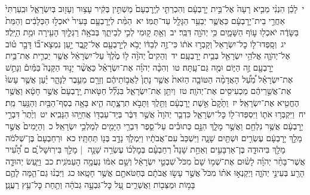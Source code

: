 \documentclass[18pt]{article}
\newcommand{\vart}[1]{\Bfootnote{#1}}	%
\begin{document}
 {\loc י~}לָכֵ֗ן הִנְנִ֨י מֵבִ֤יא רָעָה֙ אֶל־בֵּ֣ית יָרׇבְעָ֔ם וְהִכְרַתִּ֤י לְיָֽרׇבְעָם֙ מַשְׁתִּ֣ין בְּקִ֔יר עָצ֥וּר וְעָז֖וּב בְּיִשְׂרָאֵ֑ל וּבִֽעַרְתִּי֙ אַחֲרֵ֣י בֵית־יָרׇבְעָ֔ם כַּאֲשֶׁ֛ר יְבַעֵ֥ר הַגָּלָ֖ל עַד־תֻּמּֽוֹ׃ \startlock
 {\loc יא~}הַמֵּ֨ת לְיָרׇבְעָ֤ם בָּעִיר֙ יֹאכְל֣וּ הַכְּלָבִ֔ים וְהַמֵּת֙ בַּשָּׂדֶ֔ה יֹאכְל֖וּ ע֣וֹף הַשָּׁמָ֑יִם כִּ֥י יְהֹוָ֖ה דִּבֵּֽר׃ \startlock
 {\loc יב~}וְאַ֥תְּ ק֖וּמִי לְכִ֣י לְבֵיתֵ֑ךְ בְּבֹאָ֥הֿ רַגְלַ֛יִךְ הָעִ֖ירָה וּמֵ֥ת הַיָּֽלֶד׃ \startlock
 {\loc יג~}וְסָֽפְדוּ־ל֤וֹ כׇל־יִשְׂרָאֵל֙ וְקָבְר֣וּ אֹת֔וֹ כִּי־זֶ֣ה לְבַדּ֔וֹ יָבֹ֥א לְיָרׇבְעָ֖ם אֶל־קָ֑בֶר יַ֣עַן נִמְצָא־ב֞וֹ דָּבָ֣ר ט֗וֹב אֶל־יְהֹוָ֛ה אֱלֹהֵ֥י יִשְׂרָאֵ֖ל בְּבֵ֥ית יָרׇבְעָֽם׃ \startlock
 {\loc יד~}וְהֵקִים֩ יְהֹוָ֨ה ל֥וֹ מֶ֙לֶךְ֙ עַל־יִשְׂרָאֵ֔ל אֲשֶׁ֥ר יַכְרִ֛ית אֶת־בֵּ֥ית יָרׇבְעָ֖ם זֶ֣ה הַיּ֑וֹם וּמֶ֖ה גַּם־עָֽתָּה׃ \startlock
 {\loc טו~}וְהִכָּ֨ה יְהֹוָ֜ה אֶת־יִשְׂרָאֵ֗ל כַּאֲשֶׁ֨ר יָנ֣וּד הַקָּנֶה֮ בַּמַּ֒יִם֒ וְנָתַ֣שׁ אֶת־יִשְׂרָאֵ֗ל מֵ֠עַ֠ל הָאֲדָמָ֨ה הַטּוֹבָ֤ה הַזֹּאת֙ אֲשֶׁ֤ר נָתַן֙ לַאֲב֣וֹתֵיהֶ֔ם וְזֵרָ֖ם מֵעֵ֣בֶר לַנָּהָ֑ר יַ֗עַן אֲשֶׁ֤ר עָשׂוּ֙ אֶת־אֲשֵׁ֣רֵיהֶ֔ם מַכְעִיסִ֖ים אֶת־יְהֹוָֽה׃ \startlock
 {\loc טז~}וְיִתֵּ֖ן אֶת־יִשְׂרָאֵ֑ל בִּגְלַ֞ל חַטֹּ֤אות יָֽרׇבְעָם֙ אֲשֶׁ֣ר חָטָ֔א וַאֲשֶׁ֥ר הֶחֱטִ֖יא אֶת־יִשְׂרָאֵֽל׃ \startlock
 {\loc יז~}וַתָּ֙קׇם֙ אֵ֣שֶׁת יָרׇבְעָ֔ם וַתֵּ֖לֶךְ וַתָּבֹ֣א תִרְצָ֑תָה הִ֛יא בָּאָ֥ה בְסַף־הַבַּ֖יִת וְהַנַּ֥עַר מֵֽת׃ \startlock
 {\loc יח~}וַיִּקְבְּר֥וּ אֹת֛וֹ וַיִּסְפְּדוּ־ל֖וֹ כׇּל־יִשְׂרָאֵ֑ל כִּדְבַ֤ר יְהֹוָה֙ אֲשֶׁ֣ר דִּבֶּ֔ר בְּיַד־עַבְדּ֖וֹ אֲחִיָּ֥הוּ הַנָּבִֽיא׃ \startlock
 {\loc יט~}וְיֶ֙תֶר֙ דִּבְרֵ֣י יָרׇבְעָ֔ם אֲשֶׁ֥ר נִלְחַ֖ם וַאֲשֶׁ֣ר מָלָ֑ךְ הִנָּ֣ם כְּתוּבִ֗ים עַל־סֵ֛פֶר דִּבְרֵ֥י הַיָּמִ֖ים לְמַלְכֵ֥י יִשְׂרָאֵֽל׃ \startlock
 {\loc כ~}וְהַיָּמִים֙ אֲשֶׁ֣ר מָלַ֣ךְ יָרׇבְעָ֔ם עֶשְׂרִ֥ים וּשְׁתַּ֖יִם שָׁנָ֑ה וַיִּשְׁכַּב֙ עִם־אֲבֹתָ֔יו וַיִּמְלֹ֛ךְ נָדָ֥ב בְּנ֖וֹ תַּחְתָּֽיו׃ \startlock
 {\loc כא~}וּרְחַבְעָם֙ בֶּן־שְׁלֹמֹ֔ה מָלַ֖ךְ בִּיהוּדָ֑ה בֶּן־אַרְבָּעִ֣ים וְאַחַ֣ת שָׁנָה֩ רְחַבְעָ֨ם בְּמׇלְכ֜וֹ  \edtext{וּֽשְׁבַ֨ע}{\vart{א=וּֽשֲׁבַ֨ע | }}  עֶשְׂרֵ֥ה שָׁנָ֣ה  |  מָלַ֣ךְ בִּירֽוּשָׁל ַ֗͏ְם ם הָ֠עִ֠יר אֲשֶׁר־בָּחַ֨ר יְהֹוָ֜ה לָשׂ֨וּם אֶת־שְׁמ֥וֹ שָׁם֙ מִכֹּל֙ שִׁבְטֵ֣י יִשְׂרָאֵ֔ל וְשֵׁ֣ם אִמּ֔וֹ נַעֲמָ֖ה הָעַמֹּנִֽית׃ \startlock
 {\loc כב~}וַיַּ֧עַשׂ יְהוּדָ֛ה הָרַ֖ע בְּעֵינֵ֣י יְהֹוָ֑ה וַיְקַנְא֣וּ אֹת֗וֹ מִכֹּל֙ אֲשֶׁ֣ר עָשׂ֣וּ אֲבֹתָ֔ם בְּחַטֹּאתָ֖ם אֲשֶׁ֥ר חָטָֽאוּ׃ \startlock
 {\loc כג~}וַיִּבְנ֨וּ גַם־הֵ֧מָּה לָהֶ֛ם בָּמ֥וֹת וּמַצֵּב֖וֹת וַאֲשֵׁרִ֑ים עַ֚ל כׇּל־גִּבְעָ֣ה גְבֹהָ֔ה וְתַ֖חַת כׇּל־עֵ֥ץ רַעֲנָֽן׃ \startlock
\end{document}
